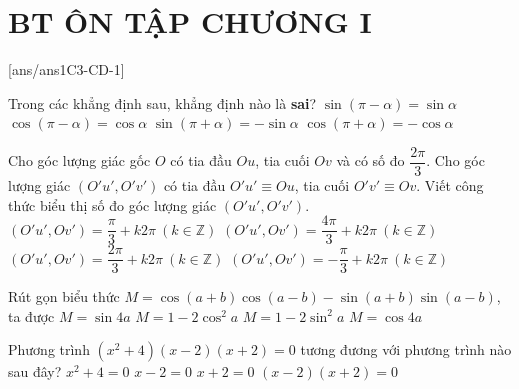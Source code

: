 \newpage 
\section*{BT ÔN TẬP CHƯƠNG I}
\setcounter{ex}{0}\setcounter{bt}{0}
[ans/ans1C3-CD-1]
\TN

\begin{ex}%
	Trong các khẳng định sau, khẳng định  nào là \textbf{sai}?
	\choice
	{$\sin(\pi-\alpha)=\sin\alpha$}
	{\True $\cos(\pi-\alpha)=\cos \alpha$}
	{$\sin(\pi+\alpha)=-\sin\alpha$}
	{$\cos(\pi+\alpha)=-\cos \alpha$}
\end{ex}

\begin{ex}%
	Cho góc lượng giác gốc $O$ có tia đầu $Ou$, tia cuối $Ov$ và có số đo $\dfrac{2\pi}{3}$. Cho góc lượng giác $(O'u',O'v')$ có tia đầu $O'u'\equiv Ou$, tia cuối $O'v'\equiv Ov$. Viết công thức biểu thị số đo góc lượng giác $(O'u',O'v')$.
	\choice
	{$(O'u',Ov')=\dfrac{\pi}{3}+k2\pi\ (k\in \mathbb{Z})$}
	{$(O'u',Ov')=\dfrac{4\pi}{3}+k2\pi\ (k\in \mathbb{Z})$}
	{\True $(O'u',Ov')=\dfrac{2\pi}{3}+k2\pi\ (k\in \mathbb{Z})$}
	{$(O'u',Ov')=-\dfrac{\pi}{3}+k2\pi\ (k\in \mathbb{Z})$}
\end{ex}

\begin{ex}%
	Rút gọn biểu thức $M=\cos(a+b)\cos(a-b)-\sin (a+b)\sin(a-b)$, ta được
	\choice
	{$M=\sin 4a$}
	{$M=1-2\cos^2a$}
	{\True $M=1-2\sin^2a$}
	{$M=\cos 4a$}
\end{ex}

\begin{ex}%
	Phương trình $\left(x^2+4\right)(x-2)(x+2)=0$ tương đương với phương trình nào sau đây?
	\choice
	{$x^2+4=0$}
	{$x-2=0$}
	{$x+2=0$}
	{\True $(x-2)(x+2)=0$}
\end{ex}

